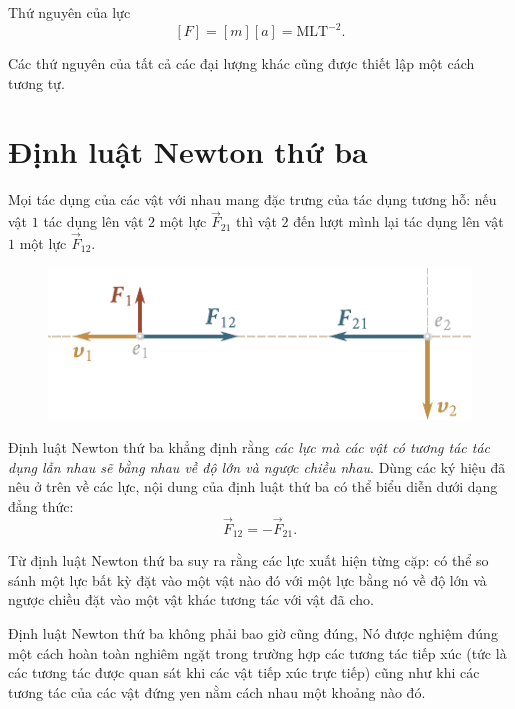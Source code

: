 \noindent
Thứ nguyên của lực
\begin{equation}\label{eq:2_16}
[F] = [m][a] = \text{MLT}^{-2}.
\end{equation}

\noindent
Các thứ nguyên của tất cả các đại lượng khác cũng được thiết lập một cách tương tự.

\section{Định luật Newton thứ ba}\label{sec:2_6}

Mọi tác dụng của các vật với nhau mang đặc trưng của tác dụng tương hỗ: nếu vật $1$ tác dụng lên vật $2$ một lực $\vec{F}_{21}$ thì vật $2$ đến lượt mình lại tác dụng lên vật $1$ một lực $\vec{F}_{12}$.

\begin{figure}[!htb]
	\begin{center}
		\includegraphics[scale=1]{figures/ch_02/fig_2_1.pdf}
		\caption[]{}
		\label{fig:2_1}
	\end{center}
\end{figure}

Định luật Newton thứ ba khẳng định rằng \textit{các lực mà các vật có tương tác tác dụng lẫn nhau sẽ bằng nhau về độ lớn và ngược chiều nhau}. Dùng các ký hiệu đã nêu ở trên về các lực, nội dung của định luật thứ ba có thể biểu diễn dưới dạng đẳng thức:
\begin{equation}\label{eq:2_17}
\vec{F}_{12} = - \vec{F}_{21}.
\end{equation}

Từ định luật Newton thứ ba suy ra rằng các lực xuất hiện từng cặp: có thể so sánh một lực bất kỳ đặt vào một vật nào đó với một lực bằng nó về độ lớn và ngược chiều đặt vào một vật khác tương tác với vật đã cho.

Định luật Newton thứ ba không phải bao giờ cũng đúng, Nó được nghiệm đúng một cách hoàn toàn nghiêm ngặt trong trường hợp các tương tác tiếp xúc (tức là các tương tác được quan sát khi các vật tiếp xúc trực tiếp) cũng như khi các tương tác của các vật đứng yen nằm cách nhau một khoảng nào đó.

